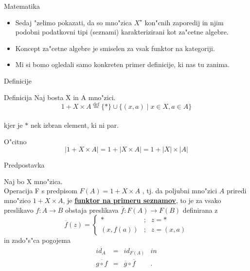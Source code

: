 \documentclass[t,usenames,dvipsnames]{beamer} %
\begin{document}
\begin{frame}{Matematika}
	
		
	\begin{itemize}
		\item Sedaj "zelimo pokazati, da so mno"zica $X^\star$ kon"cnih zaporedij in njim podobni podatkovni tipi (seznami) karakterizirani kot za"cetne algebre.
		
		\item Koncept za"cetne algebre je smiselen za vsak funktor na kategoriji.
		
		\item Mi si bomo ogledali samo konkreten primer definicije, ki nas tu zanima.
	\end{itemize}
\end{frame}
\begin{frame}{Definicije}
	\begin{block}{Definicija}
		Naj bosta X in A mno"zici.\\
		$$ 1 + X \times  A   \stackrel{\mathrm{def}}{=} \{ * \} \cup \{ (x,a) \mid x \in X , a \in A \}  $$ \\
		kjer je $*$ nek izbran element, ki ni par.
	\end{block}
	
	\begin{block}{O"citno}
		$$ | 1 + X \times A | = 1 + | X \times  A | = 1 + | X | \times | A | $$
	\end{block}
	
\end{frame}


\begin{frame}
	
	\begin{block}{Predpostavka}
		
	Naj bo X mno"zica. \\
	Operacija F s predpisom 
	$ F(A) = 1+X\times A $
	, tj. da poljubni mno"zici $A$ priredi mno"zico $1+X\times A$, je \underline{\textbf{funktor na primeru seznamov}}, to je za vsako preslikavo $ f: A \to B $ obstaja preslikava $\overline{f}: F(A) \to F(B) $ definirana z
	$$ \overline{f}(z) = 
	\left\{ \begin{array}{cll}
	* & ; & z = * \\
	(x, f(a)) & ; & z = (x, a)
	\end{array} \right. $$ 
		in zado"s"ca pogojema 
	$$ \begin{array}{clll}
	\overline{id_A} & = & id_{F(A)}  & in \\
	\overline{g \circ f} & = & \overline{g} \circ \overline{f} & .
	\end{array}   $$ 
	
	\end{block}

\end{frame}
\end{document}

